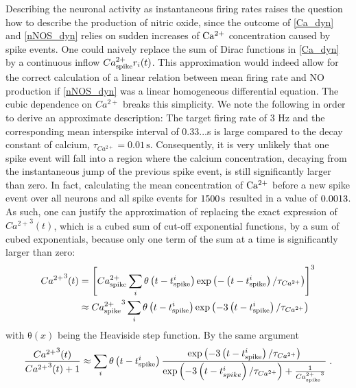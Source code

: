 \documentclass[10pt,a4paper]{article}
\begin{document}
Describing the neuronal activity as instantaneous firing rates raises the question how to describe the production of nitric oxide, since the outcome of \eqref{Ca_dyn} and \eqref{nNOS_dyn} relies on sudden increases of $\rm Ca^{2+}$ concentration caused by spike events. One could naively replace the sum of Dirac functions in \eqref{Ca_dyn} by a continuous inflow $Ca^{2+}_{\rm spike} r_i(t)$. This approximation would indeed allow for the correct calculation of a linear relation between mean firing rate and NO production if \eqref{nNOS_dyn} was a linear homogeneous differential equation. The cubic dependence on $Ca^{2+}$ breaks this simplicity. We note the following in order to derive an approximate description: The target firing rate of 3 Hz and the corresponding mean interspike interval of 0.33...s is large compared to the decay constant of calcium, $\tau_{Ca^{2+}} = \mathrm{0.01\,s}$. Consequently, it is very unlikely that one spike event will fall into a region where the calcium concentration, decaying from the instantaneous jump of the previous spike event, is still significantly larger than zero. In fact, calculating the mean concentration of $\rm Ca^{2+}$ before a new spike event over all neurons and all spike events for $\rm 1500\,s$ resulted in a value of $\rm 0.0013$. As such, one can justify the approximation of replacing the exact expression of ${Ca^{2+}}^3(t)$, which is a cubed sum of cut-off exponential functions, by a sum of cubed exponentials, because only one term of the sum at a time is significantly larger than zero:
\begin{equation}
\begin{split}
{Ca^{2+}}^3(t) &= \left[ Ca^{2+}_{\rm spike} \sum_{i} \mathrm{\theta} \left( t-t^i_{\rm spike} \right) \mathrm{exp} \left( - \left( t-t^i_{\rm spike} \right) /\tau_{Ca^{2+}} \right) \right]^3 \\
&\approx {Ca_{\rm spike}^{2+}}^3 \sum_{i} \mathrm{\theta} \left( t-t^i_{\rm spike} \right) \mathrm{exp} \left( -3 \left( t-t^i_{\rm spike} \right) /\tau_{Ca^{2+}} \right) 
\end{split} \label{cubic_approx_1}			
\end{equation}
with $\mathrm{\theta}(x)$ being the Heaviside step function. By the same argument
\begin{equation}
\frac{{Ca^{2+}}^3(t)}{{Ca^{2+}}^3(t)+1} \approx \sum_{i} \mathrm{\theta} \left( t-t^i_{\rm spike} \right) \frac{ \mathrm{exp} \left( -3 \left( t-t^i_{\rm spike} \right) /\tau_{Ca^{2+}} \right) }{\mathrm{exp} \left( -3 \left( t-t^i_{spike} \right) /\tau_{Ca^{2+}} \right) + \frac{1}{{Ca_{\rm spike}^{2+}}^3}} \; .
\end{equation}
\end{document}
